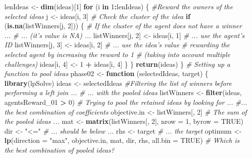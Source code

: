 \documentclass[]{elsarticle} %
\newenvironment{Shaded}{\begin{snugshade}}{\end{snugshade}}
\newcommand{\KeywordTok}[1]{\textcolor[rgb]{0.13,0.29,0.53}{\textbf{#1}}}
\newcommand{\DataTypeTok}[1]{\textcolor[rgb]{0.13,0.29,0.53}{#1}}
\newcommand{\DecValTok}[1]{\textcolor[rgb]{0.00,0.00,0.81}{#1}}
\newcommand{\StringTok}[1]{\textcolor[rgb]{0.31,0.60,0.02}{#1}}
\newcommand{\CommentTok}[1]{\textcolor[rgb]{0.56,0.35,0.01}{\textit{#1}}}
\newcommand{\OtherTok}[1]{\textcolor[rgb]{0.56,0.35,0.01}{#1}}
\newcommand{\ControlFlowTok}[1]{\textcolor[rgb]{0.13,0.29,0.53}{\textbf{#1}}}
\newcommand{\OperatorTok}[1]{\textcolor[rgb]{0.81,0.36,0.00}{\textbf{#1}}}
\newcommand{\NormalTok}[1]{#1}
\begin{document}
\begin{Shaded}
\begin{Highlighting}[]
\NormalTok{lenIdeas <-}\StringTok{ }\KeywordTok{dim}\NormalTok{(ideas)[}\DecValTok{1}\NormalTok{]}
\ControlFlowTok{for}\NormalTok{ (i }\ControlFlowTok{in} \DecValTok{1}\OperatorTok{:}\NormalTok{lenIdeas) \{}
\CommentTok{#Reward the owners of the selected ideas}
\NormalTok{j <-}\StringTok{ }\NormalTok{ideas[i, }\DecValTok{3}\NormalTok{] }\CommentTok{# Check the cluster of the idea}
\ControlFlowTok{if}\NormalTok{ (}\KeywordTok{is.na}\NormalTok{(listWinners[j, }\DecValTok{2}\NormalTok{])) \{}
\CommentTok{# If the cluster of the agent does not have a winner ...}
\CommentTok{# ... (it's value is NA) ...}
\NormalTok{listWinners[j, }\DecValTok{2}\NormalTok{] <-}\StringTok{ }\NormalTok{ideas[i, }\DecValTok{1}\NormalTok{] }\CommentTok{# ... use the agent's ID}
\NormalTok{listWinners[j, }\DecValTok{3}\NormalTok{] <-}\StringTok{ }\NormalTok{ideas[i, }\DecValTok{2}\NormalTok{] }\CommentTok{# ... use the idea's value}
\CommentTok{# rewarding the selected agent by increasing the reward to 1 }
\CommentTok{# (taking into account multiple challenges)}
\NormalTok{ideas[i, }\DecValTok{4}\NormalTok{] <-}
\DecValTok{1} \OperatorTok{+}\StringTok{ }\NormalTok{ideas[i, }\DecValTok{4}\NormalTok{] }
\NormalTok{\}}
\NormalTok{\}}
\KeywordTok{return}\NormalTok{(ideas)}
\NormalTok{\}}
\CommentTok{# Setting up a function to pool ideas}
\NormalTok{phase02 <-}\StringTok{ }\ControlFlowTok{function}\NormalTok{ (selectedIdeas, target) \{}
\KeywordTok{library}\NormalTok{(lpSolve)}
\NormalTok{ideas <-}\StringTok{ }\NormalTok{selectedIdeas}
\CommentTok{#Filtering the list of winners before performing a left join ...}
\CommentTok{# ... with the pooled ideas}
\NormalTok{listWinners <-}
\KeywordTok{filter}\NormalTok{(ideas, agentsReward_}\DecValTok{01} \OperatorTok{>}\StringTok{ }\DecValTok{0}\NormalTok{) }
\CommentTok{# Trying to pool the retained ideas by looking for ...}
\CommentTok{#... the best combination of coefficients}
\NormalTok{objective.in <-}
\NormalTok{listWinners[, }\DecValTok{2}\NormalTok{] }
\CommentTok{# The sum of the pooled ideas ...}
\NormalTok{mat <-}
\KeywordTok{matrix}\NormalTok{(listWinners[, }\DecValTok{2}\NormalTok{], }\DataTypeTok{nrow =} \DecValTok{1}\NormalTok{, }\DataTypeTok{byrow =} \OtherTok{TRUE}\NormalTok{) }
\NormalTok{dir <-}\StringTok{ "<="} \CommentTok{# ... should be below ...}
\NormalTok{rhs <-}\StringTok{ }\NormalTok{target }\CommentTok{# ... the target}
\NormalTok{optimum <-}
\KeywordTok{lp}\NormalTok{(}\DataTypeTok{direction =} \StringTok{"max"}\NormalTok{,}
\NormalTok{objective.in,}
\NormalTok{mat,}
\NormalTok{dir,}
\NormalTok{rhs,}
\DataTypeTok{all.bin =} \OtherTok{TRUE}\NormalTok{) }\CommentTok{# Which is the best combination of pooled ideas?}

\end{Highlighting}
\end{Shaded}
\end{document}
